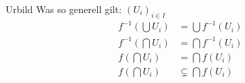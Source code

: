 \documentclass[class=article, crop=false]{standalone}
\begin{document}
\begin{zettel}{Urbild}
    Was so generell gilt: $(U_i)_{i\in I} $ 
    \begin{align*}
        f^{-1} (\bigcup U_i) &= \bigcup f^{-1} (U_i)\\
        f^{-1} (\bigcap U_i) &= \bigcap f^{-1} (U_i)\\
        f(\bigcap U_i) &= \bigcap f(U_i)\\
        f(\bigcap U_i) & \subsetneq \bigcap f(U_i)\\
    \end{align*}

\end{zettel}
\end{document}
